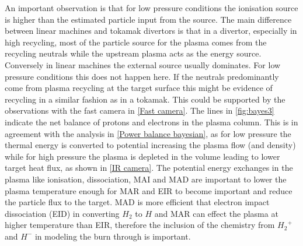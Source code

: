 An important observation is that for low pressure conditions the ionisation source is higher than the estimated particle input from the source. The main difference between linear machines and tokamak divertors is that in a divertor, especially in high recycling, most of the particle source for the plasma comes from the recycling neutrals while the upstream plasma acts as the energy source. Conversely in linear machines the external source usually dominates. For low pressure conditions this does not happen here. If the neutrals predominantly come from plasma recycling at the target surface this might be evidence of recycling in a similar fashion as in a tokamak. This could be supported by the observations with the fast camera in \autoref{Fast camera}.
The lines in \autoref{fig:bayes3} indicate the net balance of protons and electrons in the plasma column. This is in agreement with the analysis in \autoref{Power balance bayesian}, as for low pressure the thermal energy is converted to potential increasing the plasma flow (and density) while for high pressure the plasma is depleted in the volume leading to lower target heat flux, as shown in \autoref{IR camera}. The potential energy exchanges in the plasma like ionisation, dissociation, MAI and MAD are important to lower the plasma temperature enough for MAR and EIR to become important and reduce the particle flux to the target. MAD is more efficient that electron impact dissociation (EID) in converting $H_2$ to $H$ and MAR can effect the plasma at higher temperature than EIR, therefore the inclusion of the chemistry from ${H_2}^+$ and $H^-$ in modeling the burn through is important.

